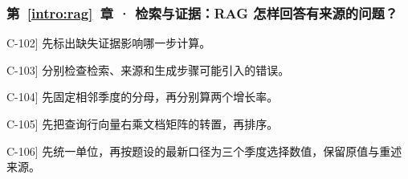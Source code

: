 \subsubsection*{第~\ref*{intro:rag}~章 · 检索与证据：RAG 怎样回答有来源的问题？}
\begin{answerhints}
\item[\hyperref[exercise:missing-evidence-response]{C-102}] \leavevmode{}\label{hint:missing-evidence-response}先标出缺失证据影响哪一步计算。
\item[\hyperref[exercise:rag-failure-modes]{C-103}] \leavevmode{}\label{hint:rag-failure-modes}分别检查检索、来源和生成步骤可能引入的错误。
\item[\hyperref[exercise:quarterly-evidence-update]{C-104}] \leavevmode{}\label{hint:quarterly-evidence-update}先固定相邻季度的分母，再分别算两个增长率。
\item[\hyperref[exercise:rag-query-ranking]{C-105}] \leavevmode{}\label{hint:rag-query-ranking}先把查询行向量右乘文档矩阵的转置，再排序。
\item[\hyperref[exercise:rag-versioned-evidence-audit]{C-106}] \leavevmode{}\label{hint:rag-versioned-evidence-audit}先统一单位，再按题设的最新口径为三个季度选择数值，保留原值与重述来源。
\end{answerhints}
